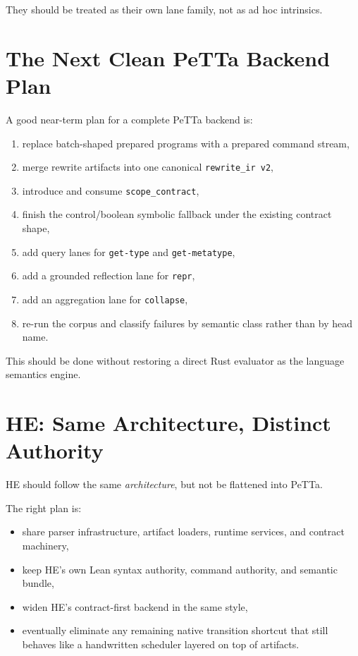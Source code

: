 \documentclass[11pt]{article}
\begin{document}
They should be treated as their own lane family, not as ad hoc intrinsics.

\section{The Next Clean PeTTa Backend Plan}

A good near-term plan for a complete PeTTa backend is:
\begin{enumerate}
  \item replace batch-shaped prepared programs with a prepared command stream,
  \item merge rewrite artifacts into one canonical \texttt{rewrite\_ir v2},
  \item introduce and consume \texttt{scope\_contract},
  \item finish the control/boolean symbolic fallback under the existing contract shape,
  \item add query lanes for \texttt{get-type} and \texttt{get-metatype},
  \item add a grounded reflection lane for \texttt{repr},
  \item add an aggregation lane for \texttt{collapse},
  \item re-run the corpus and classify failures by semantic class rather than by head name.
\end{enumerate}

This should be done without restoring a direct Rust evaluator as the language semantics engine.

\section{HE: Same Architecture, Distinct Authority}

HE should follow the same \emph{architecture}, but not be flattened into PeTTa.

The right plan is:
\begin{itemize}
  \item share parser infrastructure, artifact loaders, runtime services, and contract machinery,
  \item keep HE's own Lean syntax authority, command authority, and semantic bundle,
  \item widen HE's contract-first backend in the same style,
  \item eventually eliminate any remaining native transition shortcut that still behaves like a handwritten scheduler layered on top of artifacts.
\end{itemize}
\end{document}

